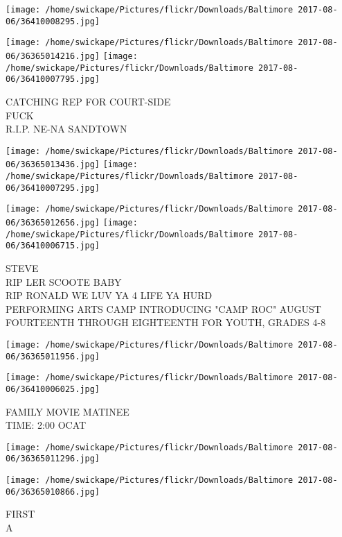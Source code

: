 \documentclass[10pt,letterpaper]{article}
\begin{document}
\texttt{[image: /home/swickape/Pictures/flickr/Downloads/Baltimore 2017-08-06/36410008295.jpg]}

\vspace{0.25in}
\texttt{[image: /home/swickape/Pictures/flickr/Downloads/Baltimore 2017-08-06/36365014216.jpg]}
\texttt{[image: /home/swickape/Pictures/flickr/Downloads/Baltimore 2017-08-06/36410007795.jpg]}

CATCHING REP FOR COURT{-}SIDE\\
FUCK\\
R.I.P. NE{-}NA SANDTOWN\\
\pagebreak

\texttt{[image: /home/swickape/Pictures/flickr/Downloads/Baltimore 2017-08-06/36365013436.jpg]}
\texttt{[image: /home/swickape/Pictures/flickr/Downloads/Baltimore 2017-08-06/36410007295.jpg]}

\texttt{[image: /home/swickape/Pictures/flickr/Downloads/Baltimore 2017-08-06/36365012656.jpg]}
\texttt{[image: /home/swickape/Pictures/flickr/Downloads/Baltimore 2017-08-06/36410006715.jpg]}

STEVE\\
RIP LER SCOOTE BABY\\
RIP RONALD WE LUV YA 4 LIFE YA HURD\\
PERFORMING ARTS CAMP INTRODUCING "CAMP ROC" AUGUST FOURTEENTH THROUGH EIGHTEENTH FOR YOUTH, GRADES 4{-}8\\
\pagebreak

\texttt{[image: /home/swickape/Pictures/flickr/Downloads/Baltimore 2017-08-06/36365011956.jpg]}

\vspace{0.25in}
\texttt{[image: /home/swickape/Pictures/flickr/Downloads/Baltimore 2017-08-06/36410006025.jpg]}

FAMILY MOVIE MATINEE\\
TIME: 2:00 OCAT\\
\pagebreak

\texttt{[image: /home/swickape/Pictures/flickr/Downloads/Baltimore 2017-08-06/36365011296.jpg]}

\vspace{0.25in}
\texttt{[image: /home/swickape/Pictures/flickr/Downloads/Baltimore 2017-08-06/36365010866.jpg]}

FIRST\\
A\\
\pagebreak
\end{document}
